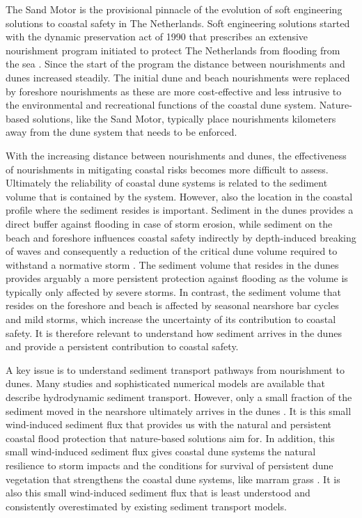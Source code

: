 The Sand Motor is the provisional pinnacle of the evolution of soft
engineering solutions to coastal safety in The Netherlands. Soft
engineering solutions started with the dynamic preservation act of
1990 that prescribes an extensive nourishment program initiated to
protect The Netherlands from flooding from the sea
\citep{MinVW1990b}. Since the start of the program the distance
between nourishments and dunes increased steadily. The initial dune
and beach nourishments were replaced by foreshore nourishments as
these are more cost-effective and less intrusive to the environmental
and recreational functions of the coastal dune system. Nature-based
solutions, like the Sand Motor, typically place nourishments
kilometers away from the dune system that needs to be enforced.

With the increasing distance between nourishments and dunes, the
effectiveness of nourishments in mitigating coastal risks becomes more
difficult to assess. Ultimately the reliability of coastal dune
systems is related to the sediment volume that is contained by the
system. However, also the location in the coastal profile where the
sediment resides is important. Sediment in the dunes provides a direct
buffer against flooding in case of storm erosion, while sediment on
the beach and foreshore influences coastal safety indirectly by
depth-induced breaking of waves and consequently a reduction of the
critical dune volume required to withstand a normative storm
\citep{Walstra2016}. The sediment volume that resides in the dunes
provides arguably a more persistent protection against flooding as the
volume is typically only affected by severe storms. In contrast, the
sediment volume that resides on the foreshore and beach is affected by
seasonal nearshore bar cycles and mild storms, which increase the
uncertainty of its contribution to coastal safety. It is therefore
relevant to understand how sediment arrives in the dunes and provide a
persistent contribution to coastal safety.

A key issue is to understand sediment transport pathways from
nourishment to dunes. Many studies and sophisticated numerical models
are available that describe hydrodynamic sediment transport. However,
only a small fraction of the sediment moved in the nearshore
ultimately arrives in the dunes \citep{Aagaard2004}. It is this small
wind-induced sediment flux that provides us with the natural and
persistent coastal flood protection that nature-based solutions aim
for. In addition, this small wind-induced sediment flux gives coastal
dune systems the natural resilience to storm impacts and the
conditions for survival of persistent dune vegetation that strengthens
the coastal dune systems, like marram grass \citep{Borsje2011}. It is
also this small wind-induced sediment flux that is least understood
and consistently overestimated by existing sediment transport models.

